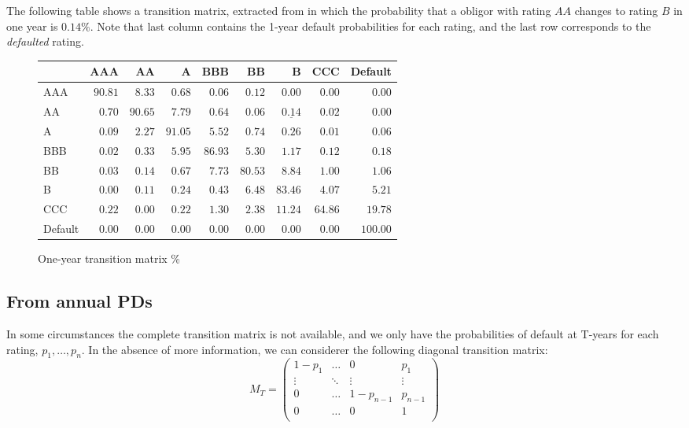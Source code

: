 \documentclass[11pt,fleqn]{book} %
\begin{document}
\begin{example}
	\label{ex:1ytm}
	The following table shows a transition matrix, extracted from 
	\cite[p. 20]{cmetrics:1997} in which the probability that a obligor with 
	rating $AA$ changes to rating $B$ in one year is $0.14\%$. Note that last 
	column contains the 1-year default probabilities for each rating, and the 
	last row corresponds to the \emph{defaulted} rating.
	\begin{figure}[!ht]
		\begin{center}
			\begin{tabular}[]{l|rrrrrrrr}
				        & AAA     & AA      & A       & BBB     & BB      & B                  & CCC     & Default  \\
				\hline
				AAA     & $90.81$ & $8.33$  & $0.68$  & $0.06$  & $0.12$  & $0.00$             & $0.00$  & $0.00$   \\
				AA      & $0.70$  & $90.65$ & $7.79$  & $0.64$  & $0.06$  & $\underline{0.14}$ & $0.02$  & $0.00$   \\
				A       & $0.09$  & $2.27$  & $91.05$ & $5.52$  & $0.74$  & $0.26$             & $0.01$  & $0.06$   \\
				BBB     & $0.02$  & $0.33$  & $5.95$  & $86.93$ & $5.30$  & $1.17$             & $0.12$  & $0.18$   \\
				BB      & $0.03$  & $0.14$  & $0.67$  & $7.73$  & $80.53$ & $8.84$             & $1.00$  & $1.06$   \\
				B       & $0.00$  & $0.11$  & $0.24$  & $0.43$  & $6.48$  & $83.46$            & $4.07$  & $5.21$   \\
				CCC     & $0.22$  & $0.00$  & $0.22$  & $1.30$  & $2.38$  & $11.24$            & $64.86$ & $19.78$  \\
				Default & $0.00$  & $0.00$  & $0.00$  & $0.00$  & $0.00$  & $0.00$             & $0.00$  & $100.00$ \\
			\end{tabular}
			\caption{One-year transition matrix \%}
			\label{tmatrix1}
		\end{center}
	\end{figure}
\end{example}

\subsection{From annual PDs}
\label{pdfsv}

In some circumstances the complete transition matrix is not available, 
and we only have the probabilities of default at T-years for each rating, 
$p_1,\dots,p_n$. In the absence of more information, we can considerer 
the following diagonal transition matrix:
\begin{displaymath}
	M_T = \left(
	\begin{array}{cccc}
		1-p_1  & \dots  & 0         & p_1     \\
		\vdots & \ddots & \vdots    & \vdots  \\
		0      & \dots  & 1-p_{n-1} & p_{n-1} \\
		0      & \dots  & 0         & 1       \\
	\end{array}
	\right)
\end{displaymath}
\end{document}
